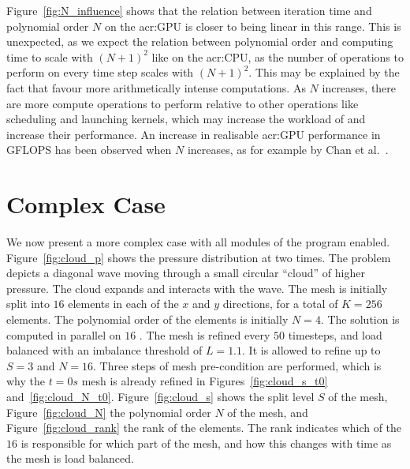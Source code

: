 Figure~\ref{fig:N_influence} shows that the relation between iteration time and polynomial order
\(N\) on the \acrshort{acr:GPU} is closer to being linear in this range. This is unexpected, as we
expect the relation between polynomial order and computing time to scale with \({\left( N + 1
\right)}^2\) like on the \acrshort{acr:CPU}, as the number of operations to perform on every time
step scales with \({\left( N + 1 \right)}^2\). This may be explained by the fact that
 favour more arithmetically intense computations. As \(N\) increases, there are
more compute operations to perform relative to other operations like scheduling and launching
kernels, which may increase the workload of  and increase their performance. An
increase in realisable \acrshort{acr:GPU} performance in GFLOPS has been observed when \(N\)
increases, as for example by Chan et al.~\cite{Chan2016}.

\section{Complex Case}\label{section:results:complex_application}

We now present a more complex case with all modules of the program enabled. Figure~\ref{fig:cloud_p}
shows the pressure distribution at two times. The problem depicts a diagonal wave moving through a
small circular ``cloud'' of higher pressure. The cloud expands and interacts with the wave. The mesh
is initially split into \(16\) elements in each of the \(x\) and \(y\) directions, for a total of
\(K = 256\) elements. The polynomial order of the elements is initially \(N = 4\). The solution is
computed in parallel on \(16\) . The mesh is refined every \(50\) timesteps, and
load balanced with an imbalance threshold of \(L = 1.1\). It is allowed to refine up to \(S = 3\)
and \(N = 16\). Three steps of mesh pre-condition are performed, which is why the \(t = 0 s\) mesh
is already refined in Figures~\ref{fig:cloud_s_t0} and~\ref{fig:cloud_N_t0}.
Figure~\ref{fig:cloud_s} shows the split level \(S\) of the mesh, Figure~\ref{fig:cloud_N} the
polynomial order \(N\) of the mesh, and Figure~\ref{fig:cloud_rank} the rank of the elements. The
rank indicates which of the \(16\)  is responsible for which part of the mesh,
and how this changes with time as the mesh is load balanced.

